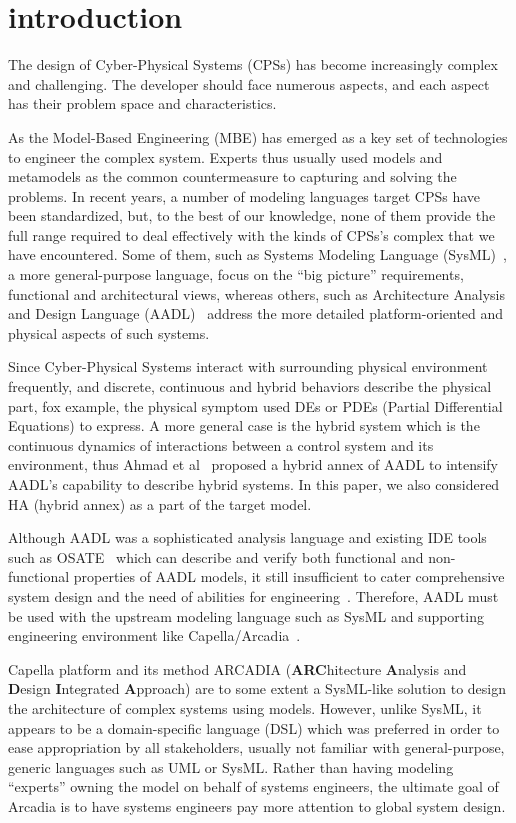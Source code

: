 \section{introduction}\label{sec:intro}
The design of Cyber-Physical Systems (CPSs) has become increasingly complex and challenging. The developer should face numerous aspects, and each aspect has their problem space and characteristics. 

As the Model-Based Engineering (MBE) has emerged as a key set of technologies to engineer the complex system. Experts thus usually used models and metamodels as the common countermeasure to capturing and solving the problems. In recent years, a number of modeling languages target CPSs have been standardized, but, to the best of our knowledge, none of them provide the full range required to deal effectively with the kinds of CPSs's complex that we have encountered. Some of them, such as Systems Modeling Language (SysML)~\cite{Group:2017vva}, a more general-purpose language, focus on the “big picture” requirements, functional and architectural views, whereas others, such as Architecture Analysis and Design Language (AADL)~\cite{Anonymous:aEmc45af} address the more detailed platform-oriented and physical aspects of such systems.  

Since Cyber-Physical Systems interact with surrounding physical environment frequently, and discrete, continuous and hybrid behaviors describe the physical part, fox example, the physical symptom used DEs or PDEs (Partial Differential Equations) to express. A more general case is the hybrid system which is the continuous dynamics of interactions between a control system and its environment, thus Ahmad et al~\cite{Ahmad:2014:HAA:2692956.2663178} proposed a hybrid annex of AADL to intensify AADL's capability to describe hybrid systems. In this paper, we also considered HA (hybrid annex) as a part of the target model. 

Although AADL was a sophisticated analysis language and existing IDE tools such as OSATE~\cite{osate2ref} which can describe and verify both functional and non-functional properties of AADL models, it still insufficient to cater comprehensive system design and the need of abilities for engineering~\cite{behjati2011extending}. Therefore, AADL must be used with the upstream modeling language such as SysML and supporting engineering environment like  Capella/Arcadia~\cite{capella2014}\cite{AModelBasedEngine:JlLHIqkz}. 

Capella platform and its method ARCADIA (\textbf{ARC}hitecture \textbf{A}nalysis and \textbf{D}esign \textbf{I}ntegrated \textbf{A}pproach) are to some extent a SysML-like solution to design the architecture of complex systems using models. However, unlike SysML, it appears to be a domain-specific language (DSL) which was preferred in order to ease appropriation by all stakeholders, usually not familiar with general-purpose, generic languages such as UML or SysML. Rather than having modeling “experts” owning the model on behalf of systems engineers, the ultimate goal of Arcadia is to have systems engineers pay more attention to global system design. 

